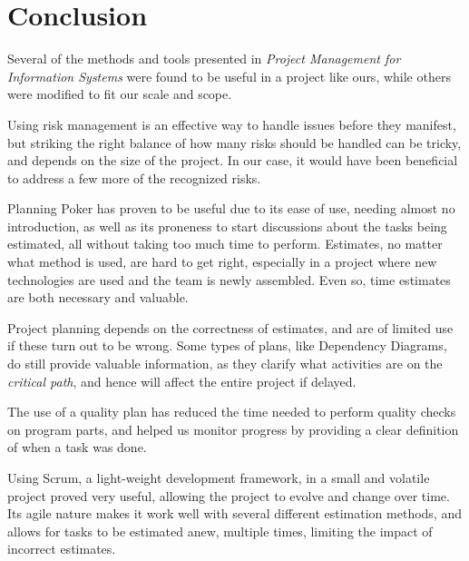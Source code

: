 \section{Conclusion}

Several of the methods and tools presented in \emph{Project Management for
Information Systems}\cite{caye} were found to be useful in a project like ours,
while others were modified to fit our scale and scope.

Using risk management is an effective way to handle issues before they
manifest, but striking the right balance of how many risks should be handled
can be tricky, and depends on the size of the project. In our case, it would
have been beneficial to address a few more of the recognized risks.

Planning Poker has proven to be useful due to its ease of use, needing
almost no introduction, as well as its proneness to start discussions about the
tasks being estimated, all without taking too much time to perform.
Estimates, no matter what method is used, are hard to get right, especially
in a project where new technologies are used and the team is newly assembled.
Even so, time estimates are both necessary and valuable.

Project planning depends on the correctness of estimates, and are of limited use
if these turn out to be wrong. Some types of plans, like Dependency Diagrams, do
still provide valuable information, as they clarify what activities are on the
\emph{critical path}, and hence will affect the entire project if delayed.

The use of a quality plan has reduced the time needed to perform quality checks
on program parts, and helped us monitor progress by providing a clear
definition of when a task was done.

Using Scrum, a light-weight development framework, in a small and volatile
project proved very useful, allowing the project to evolve and change over
time. Its agile nature makes it work well with several different estimation
methods, and allows for tasks to be estimated anew, multiple times, limiting
the impact of incorrect estimates.
